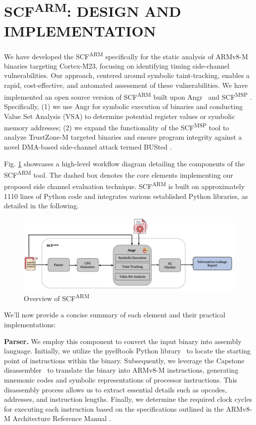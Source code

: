 \section{\ac{SCF}\textsuperscript{ARM}: DESIGN AND IMPLEMENTATION}

We have developed the \ac{SCF}\textsuperscript{ARM} specifically for the
static analysis of ARMv8-M binaries targeting Cortex-M23, focusing on
identifying timing side-channel vulnerabilities. Our approach, centered
around symbolic taint-tracking, enables a rapid, cost-effective, and
automated assessment of these vulnerabilities. We have implemented an open
source  version of \ac{SCF}\textsuperscript{ARM} built upon Angr~\cite{angr} and \ac{SCF}\textsuperscript{MSP} \cite{scfmsp}. Specifically, (1) we use Angr for symbolic execution of binaries and conducting Value Set Analysis (\ac{VSA}) to determine potential register values or symbolic memory addresses; (2) we expand the functionality of the \ac{SCF}\textsuperscript{MSP} tool to analyze TrustZone-M targeted binaries and ensure program integrity against a novel DMA-based side-channel attack termed BUSted \cite{busted}. 

Fig. \ref{fig:SCFARM} showcases a high-level workflow diagram detailing the components of the \ac{SCF}\textsuperscript{ARM} tool. The dashed box denotes the core elements implementing our proposed side channel evaluation technique. \ac{SCF}\textsuperscript{ARM} is built on approximately 1110 lines of Python code and integrates various established Python libraries, as detailed in the following.

\begin{figure}
  \centering
  \includegraphics[width=.9\textwidth]{figures/SCFARM.jpg}
  \caption{Overview of \ac{SCF}\textsuperscript{ARM}}
  \label{fig:SCFARM}
\end{figure}

We'll now provide a concise summary of each element and their practical implementations:

\textbf{Parser.} We employ this component to convert the input binary into
assembly language. Initially, we utilize the pyelftools Python
library~\cite{pyelftools} to locate the starting point of instructions
within the binary. Subsequently, we leverage the Capstone
disassembler~\cite{capstone} to translate the binary into ARMv8-M instructions, generating mnemonic codes and symbolic representations of processor instructions. This disassembly process allows us to extract essential details such as opcodes, addresses, and instruction lengths. Finally, we determine the required clock cycles for executing each instruction based on the specifications outlined in the ARMv8-M Architecture Reference Manual \cite{armv8m_ref_manual}.


